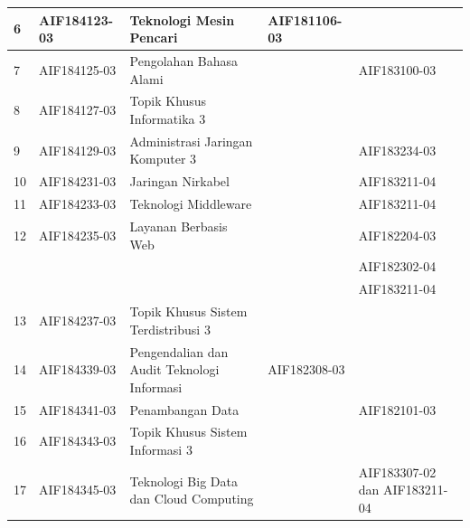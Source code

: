 \documentclass[a4paper,twoside]{article}
\begin{document}
\begin{enumerate}
\begin{enumerate}
\begin{table}[H]
\begin{tabular}{|p{0.5cm}|p{2.85cm}|p{4.95cm}|p{2.7cm}|p{2.7cm}|}
6 & AIF184123-03 & Teknologi Mesin Pencari & AIF181106-03 &  \\ \hline
7 & AIF184125-03 & Pengolahan Bahasa Alami &  & AIF183100-03 \\ \hline
8 & AIF184127-03 & Topik Khusus Informatika 3 &  &  \\ \hline
9 & AIF184129-03 & Administrasi Jaringan Komputer 3 &  & AIF183234-03 \\ \hline
10 & AIF184231-03 & Jaringan Nirkabel &  & AIF183211-04 \\ \hline
11 & AIF184233-03 & Teknologi Middleware &  & AIF183211-04 \\ \hline
12 & AIF184235-03 & Layanan Berbasis Web &  & AIF182204-03 \\
 &  &  &  & AIF182302-04 \\
 &  &  &  & AIF183211-04 \\ \hline
13 & AIF184237-03 & Topik Khusus Sistem Terdistribusi 3 &  &  \\ \hline
14 & AIF184339-03 & Pengendalian dan Audit Teknologi Informasi & AIF182308-03 &  \\ \hline
15 & AIF184341-03 & Penambangan Data &  & AIF182101-03 \\ \hline
16 & AIF184343-03 & Topik Khusus Sistem Informasi 3 &  &  \\ \hline
17 & AIF184345-03 & Teknologi Big Data dan Cloud Computing &  & AIF183307-02 dan AIF183211-04 \\ \hline
		\end{tabular}
	\label{tab:DaftarMataKuliahPilihanDanPrasyaratnya2}
\end{table}


\end{enumerate}
\end{enumerate}
\end{document}
